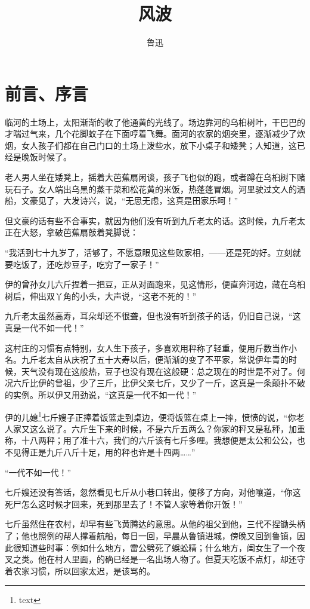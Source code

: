 \documentclass[12pt,UTF8]{ctexbook}
\title{\heiti\zihao{0} 风波}
\author{鲁迅}
\date{}
\begin{document}
\maketitle
\tableofcontents

\frontmatter
\chapter{前言、序言}

\mainmatter

临河的土场上，太阳渐渐的收了他通黄的光线了。场边靠河的乌桕树叶，干巴巴的才喘过气来，几个花脚蚊子在下面哼着飞舞。面河的农家的烟突里，逐渐减少了炊烟，女人孩子们都在自己门口的土场上泼些水，放下小桌子和矮凳；人知道，这已经是晚饭时候了。

老人男人坐在矮凳上，摇着大芭蕉扇闲谈，孩子飞也似的跑，或者蹲在乌桕树下赌玩石子。女人端出乌黑的蒸干菜和松花黄的米饭，热蓬蓬冒烟。河里驶过文人的酒船，文豪见了，大发诗兴，说，“无思无虑，这真是田家乐呵！”

但文豪的话有些不合事实，就因为他们没有听到九斤老太的话。这时候，九斤老太正在大怒，拿破芭蕉扇敲着凳脚说：

“我活到七十九岁了，活够了，不愿意眼见这些败家相，——还是死的好。立刻就要吃饭了，还吃炒豆子，吃穷了一家子！”

伊的曾孙女儿六斤捏着一把豆，正从对面跑来，见这情形，便直奔河边，藏在乌桕树后，伸出双丫角的小头，大声说，“这老不死的！”

九斤老太虽然高寿，耳朵却还不很聋，但也没有听到孩子的话，仍旧自己说，“这真是一代不如一代！”

这村庄的习惯有点特别，女人生下孩子，多喜欢用秤称了轻重，便用斤数当作小名。九斤老太自从庆祝了五十大寿以后，便渐渐的变了不平家，常说伊年青的时候，天气没有现在这般热，豆子也没有现在这般硬：总之现在的时世是不对了。何况六斤比伊的曾祖，少了三斤，比伊父亲七斤，又少了一斤，这真是一条颠扑不破的实例。所以伊又用劲说，“这真是一代不如一代！”

伊的儿媳\footnote{text}七斤嫂子正捧着饭篮走到桌边，便将饭篮在桌上一摔，愤愤的说，“你老人家又这么说了。六斤生下来的时候，不是六斤五两么？你家的秤又是私秤，加重称，十八两秤；用了准十六，我们的六斤该有七斤多哩。我想便是太公和公公，也不见得正是九斤八斤十足，用的秤也许是十四两……”

“一代不如一代！”

七斤嫂还没有答话，忽然看见七斤从小巷口转出，便移了方向，对他嚷道，“你这死尸怎么这时候才回来，死到那里去了！不管人家等着你开饭！”

七斤虽然住在农村，却早有些飞黄腾达的意思。从他的祖父到他，三代不捏锄头柄了；他也照例的帮人撑着航船，每日一回，早晨从鲁镇进城，傍晚又回到鲁镇，因此很知道些时事：例如什么地方，雷公劈死了蜈蚣精；什么地方，闺女生了一个夜叉之类。他在村人里面，的确已经是一名出场人物了。但夏天吃饭不点灯，却还守着农家习惯，所以回家太迟，是该骂的。
\end{document}
